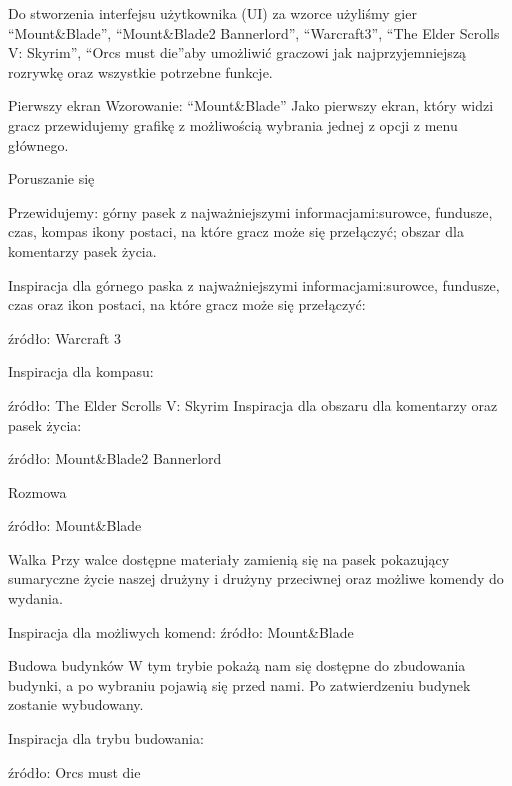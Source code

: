 Do stworzenia interfejsu użytkownika (UI) za wzorce użyliśmy gier “Mount&Blade”, “Mount&Blade2 Bannerlord”, “Warcraft3”, “The Elder Scrolls V: Skyrim”, “Orcs must die”aby umożliwić graczowi jak najprzyjemniejszą rozrywkę oraz wszystkie potrzebne funkcje.

Pierwszy ekran
Wzorowanie: “Mount&Blade”
Jako pierwszy ekran, który widzi gracz przewidujemy grafikę z możliwością wybrania jednej z opcji z menu głównego.

Poruszanie się

Przewidujemy:
górny pasek z najważniejszymi informacjami:surowce, fundusze, czas, kompas
ikony postaci, na które gracz może się przełączyć;
obszar dla komentarzy
pasek życia.

Inspiracja dla górnego paska z najważniejszymi informacjami:surowce, fundusze, czas oraz ikon postaci, na które gracz może się przełączyć:

źródło: Warcraft 3

Inspiracja dla kompasu:

źródło: The Elder Scrolls V: Skyrim
Inspiracja dla obszaru dla komentarzy oraz pasek życia:

źródło: Mount&Blade2 Bannerlord

Rozmowa 

źródło: Mount&Blade

Walka
Przy walce dostępne materiały zamienią się na pasek pokazujący sumaryczne życie naszej drużyny i drużyny przeciwnej oraz możliwe komendy do wydania.


Inspiracja dla możliwych komend:
źródło: Mount&Blade

Budowa budynków
W tym trybie pokażą nam się dostępne do zbudowania budynki, a po wybraniu pojawią się przed nami. Po zatwierdzeniu budynek zostanie wybudowany.


Inspiracja dla trybu budowania:

źródło: Orcs must die
